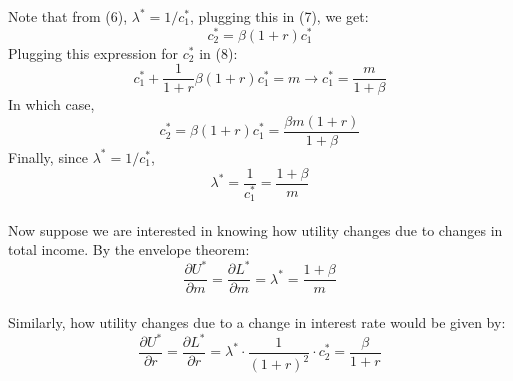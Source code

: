 \documentclass{./../Latex/handout}
\begin{document}
Note that from (6), $\lambda^*=1/c_1^*$, plugging this in (7), we get:
$$ c_2^* = \beta(1+r)c_1^*  $$
Plugging this expression for $ c_2^*$ in (8):
$$ c_1^* + \frac{1}{1+r}\beta(1+r)c_1^* = m \rightarrow c_1^* =\frac{m}{1+\beta}  $$
In which case,
$$ c_2^* = \beta(1+r)c_1^* = \frac{\beta m(1+r)}{1+\beta}    $$
Finally, since $\lambda^*=1/c_1^*$,
$$\lambda^*=\frac{1}{c_1^*} = \frac{1+\beta}{m} $$	\\

Now suppose we are interested in knowing how utility changes due to changes in total income. By the envelope theorem:
$$ \frac{\partial U^*}{\partial m}=\frac{\partial L^*}{\partial m} = \lambda^* = \frac{1+\beta}{m} $$ \\
Similarly, how utility changes due to a change in interest rate would be given by:
$$ \frac{\partial U^*}{\partial r}=\frac{\partial L^*}{\partial r} = \lambda^*\cdot \frac{1}{(1+r)^2}\cdot c_2^* = \frac{\beta}{1+r} $$ \\
\end{document}
